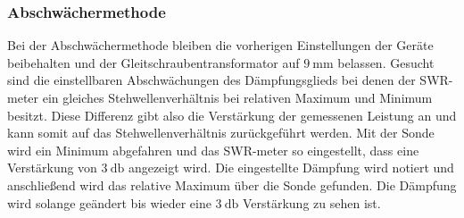 \subsubsection{Abschwächermethode}
Bei der Abschwächermethode bleiben die vorherigen Einstellungen der Geräte beibehalten und der Gleitschraubentransformator auf $\SI{9}{\milli\meter}$ belassen. Gesucht sind die einstellbaren Abschwächungen des Dämpfungsglieds bei denen der SWR-meter 
ein gleiches Stehwellenverhältnis bei relativen Maximum und Minimum besitzt. Diese Differenz gibt also die Verstärkung der gemessenen Leistung an und kann somit auf das Stehwellenverhältnis zurückgeführt werden.
Mit der Sonde wird ein Minimum abgefahren und das SWR-meter so eingestellt, dass eine Verstärkung von $\SI{3}{\decibel}$ angezeigt wird. Die eingestellte Dämpfung wird notiert und anschließend wird das relative Maximum über die Sonde gefunden. Die Dämpfung wird solange
geändert bis wieder eine $\SI{3}{\decibel}$ Verstärkung zu sehen ist.

